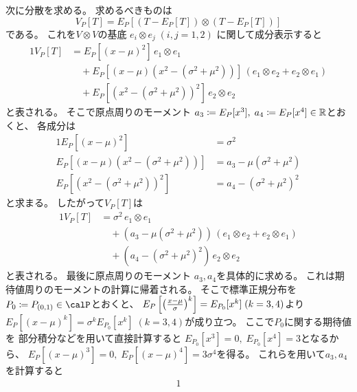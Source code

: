 \documentclass[report]{jlreq}
\begin{document}
\begin{example}
    次に分散を求める。
    求めるべきものは
    \begin{equation}
        V_P[T]
            = E_P[(T - E_P[T]) \otimes (T - E_P[T])]
    \end{equation}
    である。
    これを$V \otimes V$の基底
    $e_i \otimes e_j \; (i, j = 1, 2)$
    に関して成分表示すると
    \begin{alignat}{1}
        V_P[T]
            &=
                E_P[(x - \mu)^2] \, e_1 \otimes e_1 \\
            &\quad +
                E_P[(x - \mu)(x^2 - (\sigma^2 + \mu^2))] \,
                (e_1 \otimes e_2 + e_2 \otimes e_1) \\
            &\quad +
                E_P[(x^2 - (\sigma^2 + \mu^2))^2] \, e_2 \otimes e_2
    \end{alignat}
    と表される。
    そこで原点周りのモーメント
    $a_3 \coloneqq E_P[x^3], \; a_4 \coloneqq E_P[x^4] \in \mathbb{R}$とおくと、
    各成分は
    \begin{alignat}{1}
        E_P[(x - \mu)^2]
            &= \sigma^2 \\
        E_P[(x - \mu)(x^2 - (\sigma^2 + \mu^2))]
            &= a_3 - \mu (\sigma^2 + \mu^2) \\
        E_P[(x^2 - (\sigma^2 + \mu^2))^2]
            &= a_4 - (\sigma^2 + \mu^2)^2
    \end{alignat}
    と求まる。
    したがって$V_P[T]$は
    \begin{alignat}{1}
        V_P[T]
            &= \sigma^2 \, e_1 \otimes e_1 \\
            &\quad +
                (a_3 - \mu (\sigma^2 + \mu^2)) \,
                (e_1 \otimes e_2 + e_2 \otimes e_1) \\
            &\quad +
                (a_4 - (\sigma^2 + \mu^2)^2) \, e_2 \otimes e_2
    \end{alignat}
    と表される。
    最後に原点周りのモーメント
    $a_3, a_4$を具体的に求める。
    これは期待値周りのモーメントの計算に帰着される。
    そこで標準正規分布を$P_0 \coloneqq P_{(0, 1)} \in \calP$とおくと、
    $E_P\left[{\left({
        \frac{x - \mu}{\sigma}
    }\right)^k}\right] = E_{P_0}[x^k] \; (k = 3, 4)$より
    $E_P[(x - \mu)^k] = \sigma^k E_{P_0}[x^k] \; (k = 3, 4)$が成り立つ。
    ここで$P_0$に関する期待値を
    部分積分などを用いて直接計算すると
    $E_{P_0}[x^3] = 0, \; E_{P_0}[x^4] = 3$となるから、
    $E_P[(x - \mu)^3] = 0, \; E_P[(x - \mu)^4] = 3 \sigma^4$を得る。
    これらを用いて$a_3, a_4$を計算すると
    \begin{alignat}{1}

\end{alignat}
\end{example}
\end{document}
